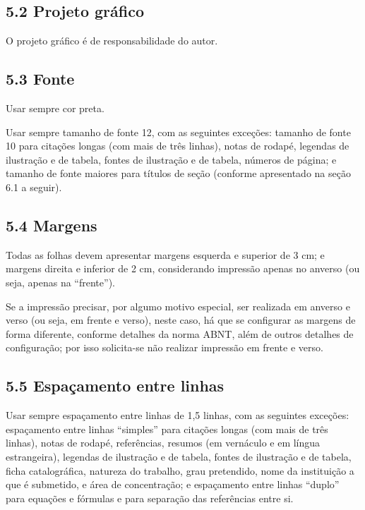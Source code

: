 \documentclass[
	12pt,				%
	oneside,			%
	a4paper,			%
	english,			%
	brazil				%
	]{abntex2ppgsi}
\begin{document}
\begin{anexosenv}
\subsection*{5.2 Projeto gráfico}

O projeto gráfico é de responsabilidade do autor.

\subsection*{5.3 Fonte}


Usar sempre cor preta.

Usar sempre tamanho de fonte 12, com as seguintes exceções: tamanho de fonte 10 para citações longas (com mais de três linhas), notas de rodapé, legendas de ilustração e de tabela, fontes de ilustração e de tabela, números de página; e tamanho de fonte maiores para títulos de seção (conforme apresentado na seção 6.1 a seguir).

\subsection*{5.4 Margens}

Todas as folhas devem apresentar margens esquerda e superior de 3 cm; e margens direita e inferior de 2 cm, considerando impressão apenas no anverso (ou seja, apenas na ``frente''). 

Se a impressão precisar, por algumo motivo especial, ser realizada em anverso e verso (ou seja, em frente e verso), neste caso, há que se configurar as margens de forma diferente, conforme detalhes da norma ABNT, além de outros detalhes de configuração; por isso solicita-se não realizar impressão em frente e verso.

\subsection*{5.5 Espaçamento entre linhas}

Usar sempre espaçamento entre linhas de 1,5 linhas, com as seguintes exceções: espaçamento entre linhas ``simples'' para citações longas (com mais de três linhas), notas de rodapé, referências, resumos (em vernáculo e em língua estrangeira), legendas de ilustração e de tabela, fontes de ilustração e de tabela, ficha catalográfica, natureza do trabalho, grau pretendido, nome da instituição a que é submetido, e área de concentração; e espaçamento entre linhas ``duplo'' para equações e fórmulas e para separação das referências entre si.


\end{anexosenv}
\end{document}

